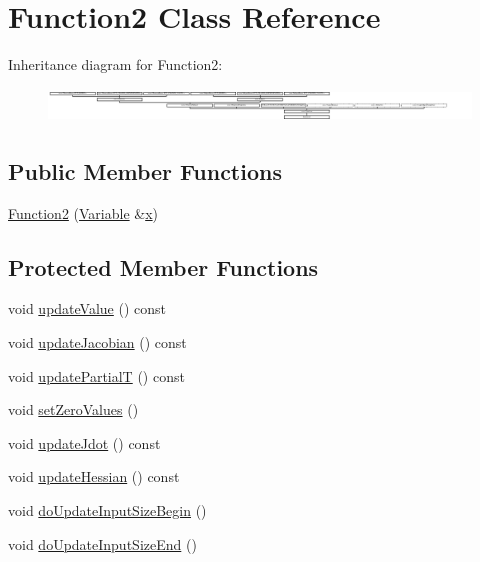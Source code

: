 \hypertarget{classFunction2}{}\section{Function2 Class Reference}
\label{classFunction2}
Inheritance diagram for Function2\+:\begin{figure}[H]
\begin{center}
\leavevmode
\includegraphics[height=0.901771cm]{d6/d7e/classFunction2}
\end{center}
\end{figure}
\subsection*{Public Member Functions}
\begin{DoxyCompactItemize}
\item 
\hyperlink{classFunction2_ad907d2408853a2d278f87293abfcdf47}{Function2} (\hyperlink{classocra_1_1Variable}{Variable} \&\hyperlink{classocra_1_1Function_a28825886d1f149c87b112ec2ec1dd486}{x})
\end{DoxyCompactItemize}
\subsection*{Protected Member Functions}
\begin{DoxyCompactItemize}
\item 
void \hyperlink{classFunction2_ae491a20ff42d37d6512bc5b45b1a2566}{update\+Value} () const
\item 
void \hyperlink{classFunction2_aed704dcbe5332636a56a49d91f40d65f}{update\+Jacobian} () const
\item 
void \hyperlink{classFunction2_ac5152db91aedd2eddb4b69e6bd446659}{update\+PartialT} () const
\item 
void \hyperlink{classFunction2_ad1ba3ed750cfec23435dcd9f37c10eec}{set\+Zero\+Values} ()
\item 
void \hyperlink{classFunction2_a134ead37ced770c93bbce1ef656564bb}{update\+Jdot} () const
\item 
void \hyperlink{classFunction2_a79440b2c9d2e8f80abe1d35352f49a1c}{update\+Hessian} () const
\item 
void \hyperlink{classFunction2_ab05887e9f8995782cdc3f9399c476c4e}{do\+Update\+Input\+Size\+Begin} ()
\item 
void \hyperlink{classFunction2_a6a875214e7fa8b07f064cd699ac29ff6}{do\+Update\+Input\+Size\+End} ()
\end{DoxyCompactItemize}
